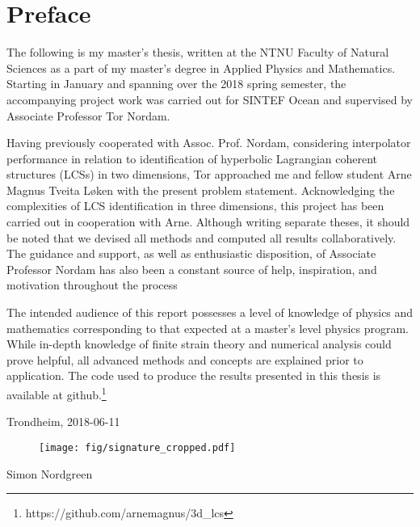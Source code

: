 \section*{Preface}

The following is my master's thesis, written at the NTNU Faculty of Natural Sciences as a  part of my master's degree in Applied Physics and Mathematics. Starting in January and spanning over the 2018 spring semester, the accompanying project work was carried out for SINTEF Ocean and supervised by Associate Professor Tor Nordam.

Having previously cooperated with Assoc. Prof. Nordam, considering interpolator performance in relation to identification of hyperbolic Lagrangian coherent structures (LCSs) in two dimensions, Tor approached me and fellow student Arne Magnus Tveita Løken with the present problem statement. Acknowledging the complexities of LCS identification in three dimensions, this project has been carried out in cooperation with Arne. Although writing separate theses, it should be noted that we devised all methods and computed all results collaboratively. The guidance and support, as well as enthusiastic disposition, of Associate Professor Nordam has also been a constant source of help, inspiration, and motivation throughout the process

The intended audience of this report possesses a level of knowledge of physics and mathematics corresponding to that expected at a master's level physics program. While in-depth knowledge of finite strain theory and numerical analysis could prove helpful, all advanced methods and concepts are explained prior to application. The code used to produce the results presented in this thesis is available at github.\footnote{https://github.com/arnemagnus/3d\_lcs}

\begin{center}
Trondheim, 2018-06-11\\[1pc]
\begin{figure}[h!]
\centering
\texttt{[image: fig/signature\_cropped.pdf]}
\end{figure}

Simon Nordgreen
\end{center}